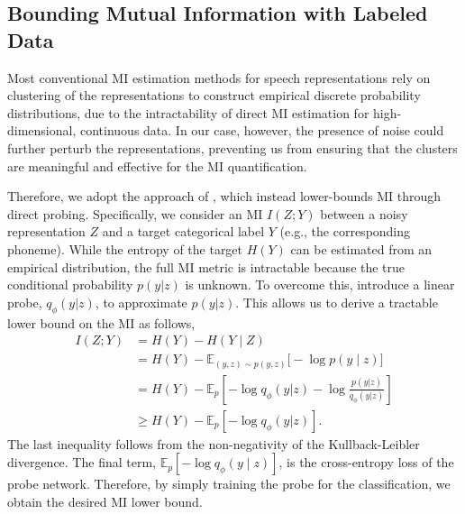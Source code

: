 \documentclass{article}
\begin{document}
\subsection{Bounding Mutual Information with Labeled Data}
\label{subsection:mi_eqs}
Most conventional MI estimation methods for speech representations \cite{clustering, speech_mi, hubert, layerwise_w2v} rely on clustering of the representations to construct empirical discrete probability distributions, due to the intractability of direct MI estimation for high-dimensional, continuous data. In our case, however, the presence of noise could further perturb the representations, preventing us from ensuring that the clusters are meaningful and effective for the MI quantification.

Therefore, we adopt the approach of \cite{mutual}, which instead lower-bounds MI through direct probing. 
Specifically, we consider an MI $I(Z;Y)$ between a noisy representation $Z$ and a target categorical label $Y$ (e.g., the corresponding phoneme). While the entropy of the target $H(Y)$ can be estimated from an empirical distribution, the full MI metric is intractable because the true conditional probability $p(y|z)$ is unknown.
To overcome this, \cite{mutual} introduce a linear probe, $q_\phi(y|z)$, to approximate $p(y|z)$. This allows us to derive a tractable lower bound on the MI as follows, %
\begin{subequations}
\begin{align}
I(Z;Y)
&= H(Y) - H(Y\mid Z) \\
&= H(Y) - \mathbb{E}_{(y,z)\sim p(y,z)}\bigl[-\log p(y\mid z)\bigr] \\
&= H(Y) - \mathbb{E}_{p}\left[
    -\log q_\phi(y|z)
    - \log\frac{p(y|z)}{q_\phi(y|z)}
  \right] \\
&\geq H(Y) - \mathbb{E}_{p}\left[-\log q_\phi(y|z)\right].
\end{align}
\end{subequations}
The last inequality follows from the non-negativity of the Kullback-Leibler divergence.
The final term, $\mathbb{E}_{p}\left[-\log q_\phi(y\mid z)\right]$, is the cross-entropy loss of the probe network. Therefore, by simply training the probe for the classification, we obtain the desired MI lower bound.
\end{document}

